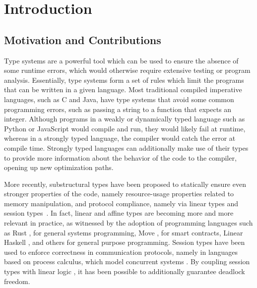 \documentclass[sigconf,nonacm,natbib=true]{acmart}
\begin{document}

\maketitle

\section{Introduction}

\subsection{Motivation and Contributions}

Type systems are a powerful tool which can be used to ensure the absence of some runtime errors, which would otherwise require extensive testing or program analysis. Essentially, type systems form a set of rules which limit the programs that can be written in a given language. Most traditional compiled imperative languages, such as C and Java, have type systems that avoid some common programming errors, such as passing a string to a function that expects an integer. Although programs in a weakly or dynamically typed language such as Python or JavaScript would compile and run, they would likely fail at runtime, whereas in a strongly typed language, the compiler would catch the error at compile time. Strongly typed languages can additionally make use of their types to provide more information about the behavior of the code to the compiler, opening up new optimization paths.

More recently, substructural types have been proposed to statically ensure even stronger properties of the code, namely resource-usage properties related to memory manipulation, and protocol compliance, namely via linear types and session types~\citep{Wadler:1990,Honda:1998,Mostrous:2014}. In fact, linear and affine types are becoming more and more relevant in practice, as witnessed by the adoption of programming languages such as Rust \citep{Matsakis:2014}, for general systems programming, Move \citep{Move:2019, Move:2020}, for smart contracts, Linear Haskell \citep{Bernardy:2017}, and others \citep{Rast:2022, Ferrite:2022, C0:2016, FreeST:2019, Jacobs:2023} for general purpose programming. Session types have been used to enforce correctness in communication protocols, namely in languages based on process calculus, which model concurrent systems \citep{Milner:1980,Milner:1992:1,Milner:1992:2}. By coupling session types with linear logic \citep{Girard:1987,Caires:2010}, it has been possible to additionally guarantee deadlock freedom. 
\end{document}
